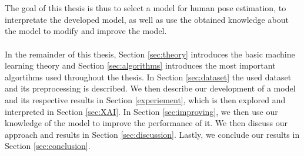 \documentclass[./main.tex]{subfiles}
\begin{document}
\\
\\
The goal of this thesis is thus to select a model for human pose estimation, to interpretate the developed model, as well as use the obtained knowledge about the model to modify and improve the model. %
\\
\\
In the remainder of this thesis, Section \ref{sec:theory} introduces the basic machine learning theory and Section \ref{sec:algorithms} introduces the most important algortihms used throughout the thesis. In Section \ref{sec:dataset} the used dataset and its preprocessing is described. We then describe our development of a model and its respective results in Section \ref{experiement}, which is then explored and interpreted in Section \ref{sec:XAI}. In Section \ref{sec:improving}, we then use our knowledge of the model to improve the performance of it. We then discuss our approach and results in Section \ref{sec:discussion}. Lastly, we conclude our results in Section \ref{sec:conclusion}.
\end{document}
